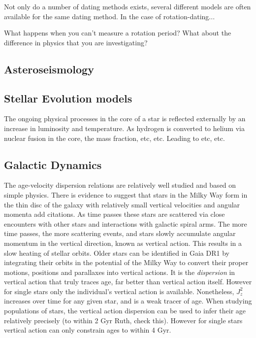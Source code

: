 \documentclass[useAMS, usenatbib, preprint, 12pt]{aastex}
\newcommand{\racomment}[1]{{\color{red}#1}}
\begin{document}
Not only do a number of dating methods exists, several different models are
often available for the same dating method.
In the case of rotation-dating...

\racomment{What happens when you can't measure a rotation period?}
\racomment{What about the difference in physics that you are investigating?}

\subsection{Asteroseismology}

\subsection{Stellar Evolution models}
The ongoing physical processes in the core of a star is reflected externally
by an increase in luminosity and temperature.
As hydrogen is converted to helium via nuclear fusion in the core, the mass
fraction, etc, etc.
Leading to etc, etc.


\subsection{Galactic Dynamics}

The age-velocity dispersion relations are relatively well studied and based on
simple physics.
There is evidence to suggest that stars in the Milky Way form in the thin disc
of the galaxy with relatively small vertical velocities and angular momenta
\racomment{add citations}.
As time passes these stars are scattered via close encounters with other
stars and interactions with galactic spiral arms.
The more time passes, the more scattering events, and stars slowly accumulate
angular momentum in the vertical direction, known as vertical action.
This results in a slow heating of stellar orbits.
Older stars can be identified in Gaia DR1 by integrating their orbits in the
potential of the Milky Way to convert their proper motions, positions and
parallaxes into vertical actions.
It is the {\it dispersion} in vertical action that truly traces age, far
better than vertical action itself.
However for single stars only the individual's vertical action is available.
Nonetheless, $J_z^2$ increases over time for any given star, and is a weak
tracer of age.
When studying populations of stars, the vertical action dispersion can be used
to infer their age relatively precisely (to within 2 Gyr
\racomment{Ruth, check this}).
However for single stars vertical action can only constrain ages to within 4
Gyr.
\end{document}
